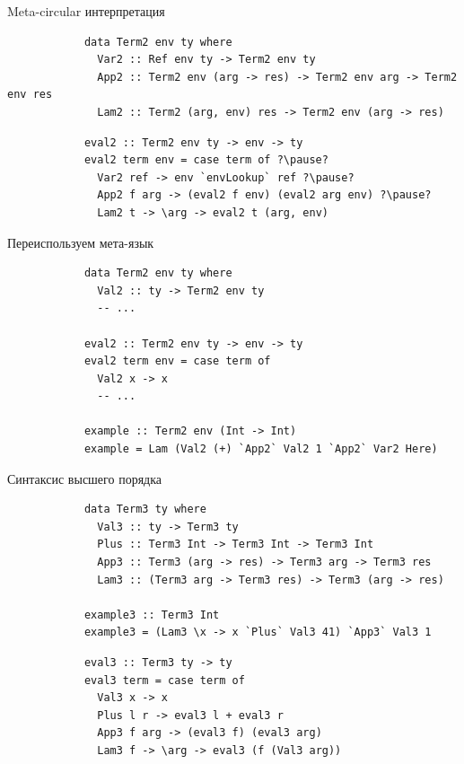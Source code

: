     \begin{frame}[fragile]{Meta-circular интерпретация}
        \pause
        \begin{verbatim}
            data Term2 env ty where
              Var2 :: Ref env ty -> Term2 env ty
              App2 :: Term2 env (arg -> res) -> Term2 env arg -> Term2 env res
              Lam2 :: Term2 (arg, env) res -> Term2 env (arg -> res)
        \end{verbatim}
        \pause\vspace{1em}
        \begin{verbatim}
            eval2 :: Term2 env ty -> env -> ty
            eval2 term env = case term of ?\pause?
              Var2 ref -> env `envLookup` ref ?\pause?
              App2 f arg -> (eval2 f env) (eval2 arg env) ?\pause?
              Lam2 t -> \arg -> eval2 t (arg, env)
        \end{verbatim}
    \end{frame}

    \begin{frame}[fragile]{Переиспользуем мета-язык}
        \pause
        \begin{verbatim}
            data Term2 env ty where
              Val2 :: ty -> Term2 env ty
              -- ...

            eval2 :: Term2 env ty -> env -> ty
            eval2 term env = case term of
              Val2 x -> x
              -- ...

            example :: Term2 env (Int -> Int)
            example = Lam (Val2 (+) `App2` Val2 1 `App2` Var2 Here)
        \end{verbatim}
    \end{frame}

    \begin{frame}[fragile]{Синтаксис высшего порядка}
        \pause
        \begin{verbatim}
            data Term3 ty where
              Val3 :: ty -> Term3 ty
              Plus :: Term3 Int -> Term3 Int -> Term3 Int
              App3 :: Term3 (arg -> res) -> Term3 arg -> Term3 res
              Lam3 :: (Term3 arg -> Term3 res) -> Term3 (arg -> res)

            example3 :: Term3 Int
            example3 = (Lam3 \x -> x `Plus` Val3 41) `App3` Val3 1
        \end{verbatim}
        \pause\vspace{1em}
        \begin{verbatim}
            eval3 :: Term3 ty -> ty
            eval3 term = case term of
              Val3 x -> x
              Plus l r -> eval3 l + eval3 r
              App3 f arg -> (eval3 f) (eval3 arg)
              Lam3 f -> \arg -> eval3 (f (Val3 arg))
        \end{verbatim}
    \end{frame}

